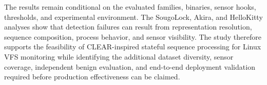 The results remain conditional on the evaluated families, binaries, sensor hooks, thresholds, and experimental environment. The SougoLock, Akira, and HelloKitty analyses show that detection failures can result from representation resolution, sequence composition, process behavior, and sensor visibility. The study therefore supports the feasibility of CLEAR-inspired stateful sequence processing for Linux VFS monitoring while identifying the additional dataset diversity, sensor coverage, independent benign evaluation, and end-to-end deployment validation required before production effectiveness can be claimed.
